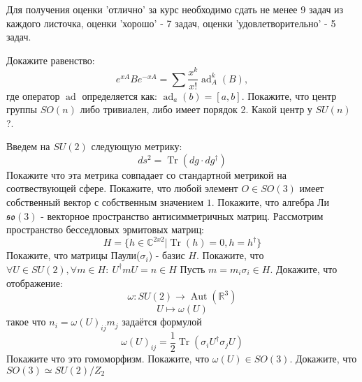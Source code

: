 \documentclass[12pt]{article}
\DeclareMathOperator{\Tr}{Tr}
\DeclareMathOperator{\Aut}{Aut}
\DeclareMathOperator{\ad}{ad}
\begin{document}
	
	Для получения оценки 'отлично' за курс необходимо сдать не менее 9 задач из каждого листочка, оценки 'хорошо' - 7 задач, оценки 'удовлетворительно' - 5 задач. 
	
	\p
	Докажите равенство:
	$$ e^{xA}Be^{-xA} = \sum \frac{x^k}{x!} \ad_{A}^k (B),$$
	где оператор $\ad$ определяется как: $\ad_a(b) = [a,b]$. 
	\ep
	\p Покажите, что центр группы $SO(n)$ либо тривиален, либо имеет порядок 2. Какой центр у $SU(n)$?.
	\ep


	\p
	Введем на $SU(2)$ следующую метрику:
	$$ds^2 = \Tr  (dg\cdot dg^\dagger)$$
	Покажите что эта метрика совпадает со стандартной метрикой на соотвествующей сфере.
	\ep
	\p
	Покажите, что любой элемент $O \in SO(3)$ имеет собственный вектор с собственным значением $1$.
	\ep
	\p
	Покажите, что алгебра Ли $\mathfrak{so}(3)$ - векторное пространство антисимметричных матриц. 
	\ep
	Рассмотрим пространство бесседловых эрмитовых матриц:
	$$H = \{ h \in \mathbb{C}^{2x2} | \Tr(h)=0, h=h^\dagger  \}$$
	\p
	Покажите, что матрицы Паули($\sigma_i$) - базис $H$.
	Покажите, что $\forall U \in SU(2), \forall m \in H: \ U^\dagger m U = n \in H$
	\ep
	\p 
	Пусть $m=m_i \sigma_i \in H$. Докажите, что отображение:
	$$\omega: SU(2) \to \Aut(\mathbb{R}^3)$$
	$$U \mapsto \omega(U)$$
	такое что $n_i = \omega(U)_{ij} m_j$ задаётся формулой $$\omega(U)_{ij} = \frac 1 2 \Tr(\sigma_i U^\dagger \sigma_j U) $$ Покажите что это гомоморфизм.
	\ep
	\p
	Покажите, что $\omega(U) \in SO(3)$.
	\ep
	\p 	
	Докажите, что $SO(3) \simeq SU(2) / Z_2$
	\ep
\end{document}
